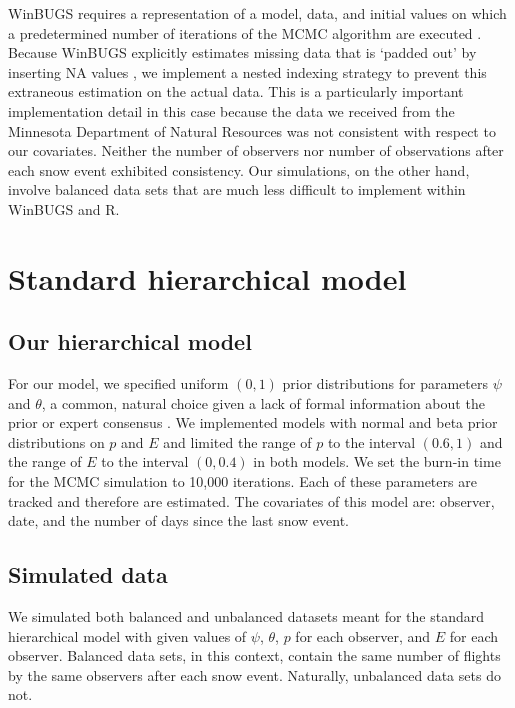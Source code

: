\documentclass[12pt]{article}
\begin{document}
    WinBUGS requires a representation of a model, data, and initial values on
    which a predetermined number of iterations of the MCMC algorithm are
    executed \cite{MacKenzie2006}. Because WinBUGS explicitly estimates missing
    data that is `padded out' by inserting NA values \cite{Spiegelhalter2003},
    we implement a nested indexing strategy to prevent this extraneous
    estimation on the actual data. This is a particularly important
    implementation detail in this case because the data we received from the
    Minnesota Department of Natural Resources was not consistent with respect to
    our covariates. Neither the number of observers nor number of observations
    after each snow event exhibited consistency. Our simulations, on the other
    hand, involve balanced data sets that are much less difficult to implement
    within WinBUGS and R.

\section{Standard hierarchical model}

    \subsection{Our hierarchical model}
    For our model, we specified uniform \((0, 1)\) prior distributions for
    parameters \(\psi\) and \(\theta\), a common, natural choice given a lack of
    formal information about the prior or expert consensus \cite{MacKenzie2006}.
    We implemented models with normal and beta prior distributions on \(p\) and
    \(E\) and limited the range of \(p\) to the interval \((0.6, 1)\) and the
    range of \(E\) to the interval \((0, 0.4)\) in both models. We set the
    burn-in time for the MCMC simulation to 10,000 iterations. Each of these
    parameters are tracked and therefore are estimated. The covariates of this
    model are: observer, date, and the number of days since the last snow event.

    \subsection{Simulated data}
    We simulated both balanced and unbalanced datasets meant for the standard
    hierarchical model with given values of \(\psi\), \(\theta\), \(p\) for each
    observer, and \(E\) for each observer.  Balanced data sets, in this context,
    contain the same number of flights by the same observers after each snow
    event.  Naturally, unbalanced data sets do not.
\end{document}
